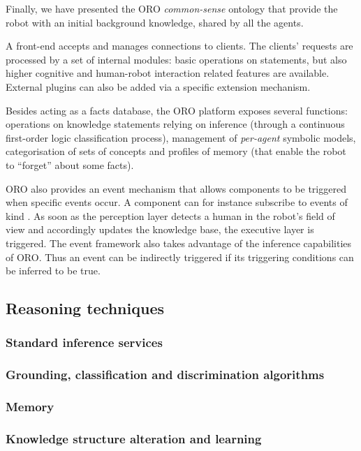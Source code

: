 Finally, we have presented the ORO \emph{common-sense} ontology that provide
the robot with an initial background knowledge, shared by all the agents.


A front-end accepts and manages connections to clients. The clients' requests
are processed by a set of internal modules: basic operations on statements, but
also higher cognitive and human-robot interaction related features are
available. External plugins can also be added via a specific extension
mechanism.

Besides acting as a facts database, the ORO platform exposes several
functions: operations on knowledge statements relying on inference (through a
continuous first-order logic classification process), management of
\emph{per-agent} symbolic models, categorisation of sets of concepts
and profiles of memory (that enable the robot to ``forget'' about some facts).

ORO also provides an event mechanism that allows components to be triggered
when specific events occur. A component can for instance subscribe to events
of kind . As soon as the
perception layer detects a human in the robot's field of view and accordingly
updates the knowledge base, the executive layer is triggered. The event
framework also takes advantage of the inference capabilities of ORO. Thus an
event can be indirectly triggered if its triggering conditions can be
inferred to be true.

\subsection{Reasoning techniques}

\subsubsection{Standard inference services}
\subsubsection{Grounding, classification and discrimination algorithms}
\subsubsection{Memory}
\subsubsection{Knowledge structure alteration and learning}




